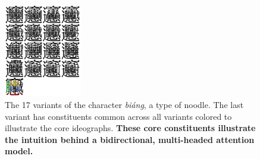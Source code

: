 \begin{figure}[t]
    \begin{center}
        \includegraphics[width=0.3\textwidth]{figures/biang-variants.png}
        \caption[The 17 variants of \textit{biáng}]{The 17 variants of the character \textit{biáng}, a type of noodle. The last variant has constituents common across all variants colored to illustrate the core ideographs. \newline\textbf{These core constituents illustrate the intuition behind a bidirectional, multi-headed attention model.}}
        \label{fig:biang}
    \end{center}
\end{figure}
